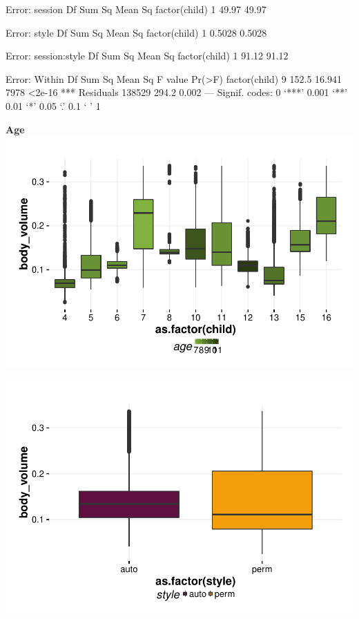 \documentclass{article}
\begin{document}
\begin{Schunk}
\begin{Soutput}
Error: session
              Df Sum Sq Mean Sq
factor(child)  1  49.97   49.97

Error: style
              Df Sum Sq Mean Sq
factor(child)  1 0.5028  0.5028

Error: session:style
              Df Sum Sq Mean Sq
factor(child)  1  91.12   91.12

Error: Within
                  Df Sum Sq Mean Sq F value Pr(>F)    
factor(child)      9  152.5  16.941    7978 <2e-16 ***
Residuals     138529  294.2   0.002                   
---
Signif. codes:  0 ‘***’ 0.001 ‘**’ 0.01 ‘*’ 0.05 ‘.’ 0.1 ‘ ’ 1
\end{Soutput}
\end{Schunk}

\textbf{Age}
\includegraphics{features-plot_body_volume_child_age_quiz}

\includegraphics{features-plot_body_volume_style_quiz}
\end{document}
